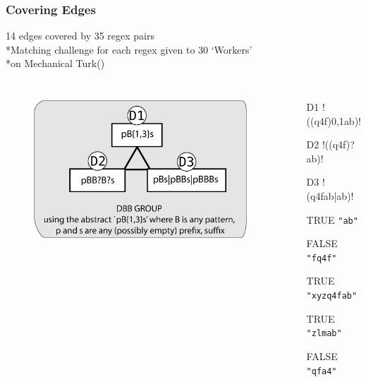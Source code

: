 
\begin{frame}[fragile]
\frametitle{Covering Edges}
\begin{center}
14 edges covered by 35 regex pairs
\\*Matching challenge for each regex given to 30 `Workers'
\\*on Mechanical Turk(\cite{mturk})
\end{center}
\begin{columns}[t]
\begin{figure}
  \includegraphics[scale=0.35]{nontex/illustrations/DBBExample.eps}
  \label{fig:DBBExample}
\end{figure}
\begin{itemize}
\item[D1] \cverb!((q4f){0,1}ab)!
\item[D2] \cverb!((q4f)?ab)!
\item[D3] \cverb!(q4fab|ab)!
\item[TRUE] \verb|"ab"|
\item[FALSE] \verb|"fq4f"|
\item[TRUE] \verb|"xyzq4fab"|
\item[TRUE] \verb|"zlmab"|
\item[FALSE] \verb|"qfa4"|
\end{itemize}
\end{columns}
\end{frame}


